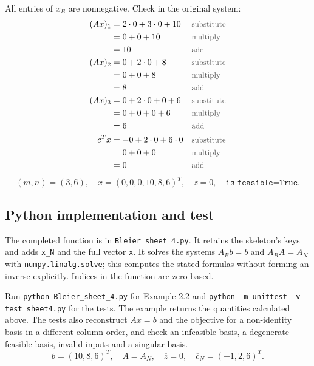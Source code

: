 \documentclass[a4paper,11pt]{article}
\newif\ifexplain
\newcommand{\teil}[1]{\subsection*{#1}}
\newcommand{\why}[1]{\text{\small\color{black!65}#1}}
\newcommand{\explain}[1]{\ifexplain\begin{erklbox}#1\end{erklbox}\fi}
\begin{document}
All entries of $x_B$ are nonnegative. Check in the original system:
\begin{align*}
(Ax)_1&=2\cdot0+3\cdot0+10&&\why{substitute}\\
&=0+0+10&&\why{multiply}\\
&=10&&\why{add}\\
(Ax)_2&=0+2\cdot0+8&&\why{substitute}\\
&=0+0+8&&\why{multiply}\\
&=8&&\why{add}\\
(Ax)_3&=0+2\cdot0+0+6&&\why{substitute}\\
&=0+0+0+6&&\why{multiply}\\
&=6&&\why{add}\\
c^Tx&=-0+2\cdot0+6\cdot0&&\why{substitute}\\
&=0+0+0&&\why{multiply}\\
&=0&&\why{add}
\end{align*}
\[\boxed{(m,n)=(3,6),\quad x=(0,0,0,10,8,6)^T,\quad z=0,\quad\texttt{is\_feasible=True}.}\]
\explain{Nichtnegativität erlaubt auch null. Die Anfangslösung ist damit zulässig, aber wir behaupten nicht, dass sie optimal ist. Die Aufgabe verlangt nur, das Anfangs-Dictionary aufzubauen. Die positiven reduzierten Kosten zeigen hier sogar mögliche Verbesserungsrichtungen, solange die Nebenbedingungen sie zulassen.}
\teil{Python implementation and test}
The completed function is in \texttt{Bleier\_sheet\_4.py}. It retains the skeleton's keys and adds \texttt{x\_N} and the full vector \texttt{x}. It solves the systems $A_B\overline b=b$ and $A_B\overline A=A_N$ with \texttt{numpy.linalg.solve}; this computes the stated formulas without forming an inverse explicitly. Indices in the function are zero-based.

Run \texttt{python Bleier\_sheet\_4.py} for Example 2.2 and \texttt{python -m unittest -v test\_sheet4.py} for the tests. The example returns the quantities calculated above. The tests also reconstruct $Ax=b$ and the objective for a non-identity basis in a different column order, and check an infeasible basis, a degenerate feasible basis, invalid inputs and a singular basis.
\[\boxed{\overline b=(10,8,6)^T,\quad \overline A=A_N,\quad\overline z=0,\quad\overline c_N=(-1,2,6)^T.}\]
\explain{Im Code geben wir $c$ als eindimensionales Array ein. Das Produkt \texttt{c\_B @ A\_bar} entspricht dann der Zeile $c_B^T\overline A$. Die Formen der Arrays werden vor dem Rechnen geprüft. Eine singuläre Basis wird nicht als unzulässig markiert, sondern als Fehler gemeldet: Ohne invertierbare Basismatrix gibt es dieses Dictionary gar nicht. Für die Zulässigkeit übernimmt der Code genau den Vergleich aus dem Skelett, also \texttt{b\_bar >= 0} ohne Toleranz. Bei fast singulären Daten und Rundungsfehlern wäre eine gesonderte numerische Behandlung nötig; die ganzzahligen Beispieldaten bereiten hier kein Problem.}
\end{document}
